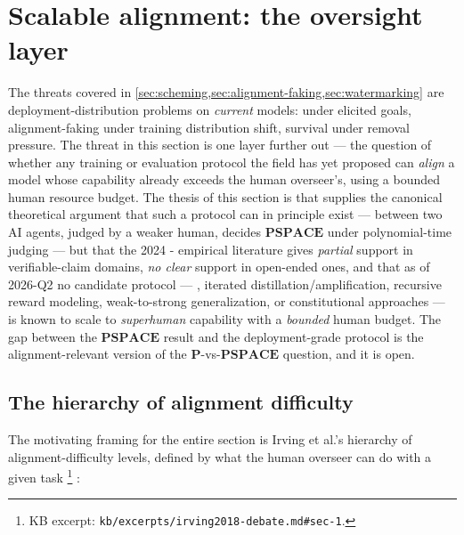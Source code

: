
\section{Scalable alignment: the oversight layer}
\label{sec:scalable-oversight}

The threats covered in
\cref{sec:scheming,sec:alignment-faking,sec:watermarking} are
deployment-distribution problems on \emph{current} models: 
under elicited goals, alignment-faking under training distribution
shift,  survival under removal pressure. The threat in this
section is one layer further out --- the question of whether any
training or evaluation protocol the field has yet proposed can
\emph{align} a model whose capability already exceeds the human
overseer's, using a bounded human resource budget. The thesis of this
section is that \citet{irving2018-debate} supplies the canonical
theoretical argument that such a protocol can in principle exist ---
 between two AI agents, judged by a weaker human, decides
$\mathbf{PSPACE}$ under polynomial-time judging --- but that the 2024
- empirical literature gives \emph{partial} support in
verifiable-claim domains, \emph{no clear} support in open-ended ones,
and that as of 2026-Q2 no candidate protocol --- , iterated
distillation/amplification, recursive reward modeling, weak-to-strong
generalization, or constitutional approaches --- is known to scale to
\emph{superhuman} capability with a \emph{bounded} human budget. The
gap between the $\mathbf{PSPACE}$ result and the deployment-grade
protocol is the alignment-relevant version of the
$\mathbf{P}$-vs-$\mathbf{PSPACE}$ question, and it is open.

\subsection{The hierarchy of alignment difficulty}
\label{sec:oversight-hierarchy}

The motivating framing for the entire section is Irving et al.'s
hierarchy of alignment-difficulty levels, defined by what the human
overseer can do with a given task%
\footnote{KB excerpt: \nolinkurl{kb/excerpts/irving2018-debate.md#sec-1}.}
\citep[\S 1]{irving2018-debate}:


